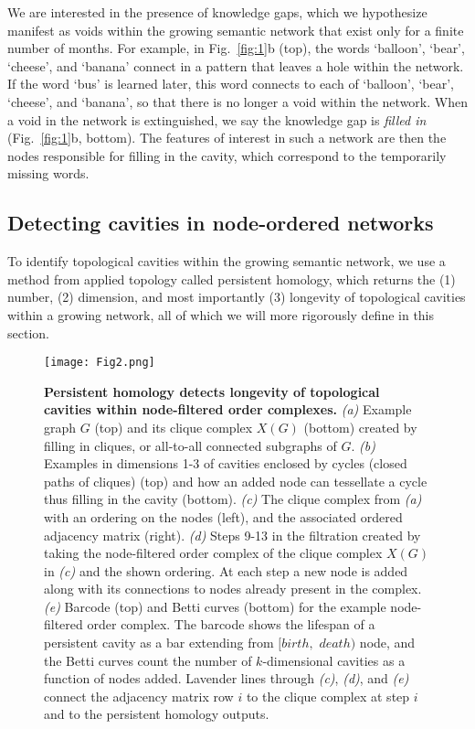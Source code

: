 \documentclass{article}
\begin{document}
We are interested in the presence of knowledge gaps, which we hypothesize manifest as voids within the growing semantic network that exist only for a finite number of months. For example, in Fig.~\ref{fig:1}b (top), the words `balloon', `bear', `cheese', and `banana' connect in a pattern that leaves a hole within the network. If the word `bus' is learned later, this word connects to each of `balloon', `bear', `cheese', and `banana', so that there is no longer a void within the network. When a void in the network is extinguished, we say the knowledge gap is \emph{filled in} (Fig.~\ref{fig:1}b, bottom). The features of interest in such a network are then the nodes responsible for filling in the cavity, which correspond to the temporarily missing words.


\subsection*{Detecting cavities in node-ordered networks}

To identify topological cavities within the growing semantic network, we use a method from applied topology called persistent homology, which returns the (1) number, (2) dimension, and most importantly (3) longevity of topological cavities within a growing network, all of which we will more rigorously define in this section.



 \begin{figure*}[t]
 	\centering
 	\texttt{[image: Fig2.png]}
 	\caption{\textbf{Persistent homology detects longevity of topological cavities within node-filtered order complexes.} \emph{(a)} Example graph $G$ (top) and its clique complex $X(G)$ (bottom) created by filling in cliques, or all-to-all connected subgraphs of $G$. \emph{(b)} Examples in dimensions 1-3 of cavities enclosed by cycles (closed paths of cliques) (top) and how an added node can tessellate a cycle thus filling in the cavity (bottom). \emph{(c)} The clique complex from \emph{(a)} with an ordering on the nodes (left), and the associated ordered adjacency matrix (right). \emph{(d)} Steps 9-13 in the filtration created by taking the node-filtered order complex of the clique complex $X(G)$ in \emph{(c)} and the shown ordering. At each step a new node is added along with its connections to nodes already present in the complex. \emph{(e)} Barcode (top) and Betti curves (bottom) for the example node-filtered order complex. The barcode shows the lifespan of a persistent cavity as a bar extending from $[birth,$ $death)$ node, and the Betti curves count the number of $k$-dimensional cavities as a function of nodes added. Lavender lines through \emph{(c)}, \emph{(d)}, and \emph{(e)} connect the adjacency matrix row $i$ to the clique complex at step $i$ and to the persistent homology outputs. }
 	\label{fig:2}
 \end{figure*}
 
\end{document}
